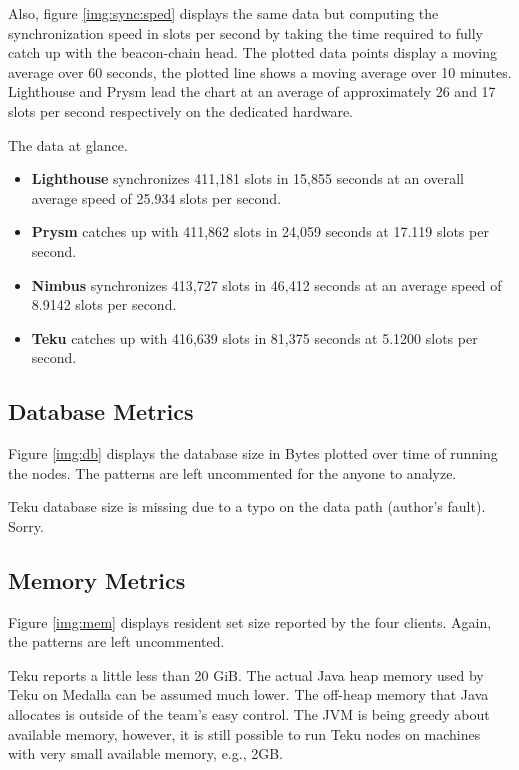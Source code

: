 \documentclass[twoside,twocolumn]{article}
\begin{document}
Also, figure \ref{img:sync:sped} displays the same data but computing the synchronization speed in slots per second by taking the time required to fully catch up with the beacon-chain head. The plotted data points display a moving average over 60 seconds, the plotted line shows a moving average over 10 minutes. Lighthouse and Prysm lead the chart at an average of approximately 26 and 17 slots per second respectively on the dedicated hardware.\par

The data at glance.
\begin{itemize}
\item \textbf{Lighthouse} synchronizes 411,181 slots in 15,855 seconds at an overall average speed of 25.934 slots per second.
\item \textbf{Prysm} catches up with 411,862 slots in 24,059 seconds at 17.119 slots per second.
\item \textbf{Nimbus} synchronizes 413,727 slots in 46,412 seconds at an average speed of 8.9142 slots per second.
\item \textbf{Teku} catches up with 416,639 slots in 81,375 seconds at 5.1200 slots per second.
\end{itemize}

\subsection{Database Metrics}
Figure \ref{img:db} displays the database size in Bytes plotted over time of running the nodes. The patterns are left uncommented for the anyone to analyze.\par

Teku database size is missing due to a typo on the data path (author's fault). Sorry.

\subsection{Memory Metrics}
Figure \ref{img:mem} displays resident set size reported by the four clients. Again, the patterns are left uncommented.\par

Teku reports a little less than 20 GiB. The actual Java heap memory used by Teku on Medalla can be assumed much lower. The off-heap memory that Java allocates is outside of the team's easy control. The JVM is being greedy about available memory, however, it is still possible to run Teku nodes on machines with very small available memory, e.g., 2GB.\par
\end{document}
